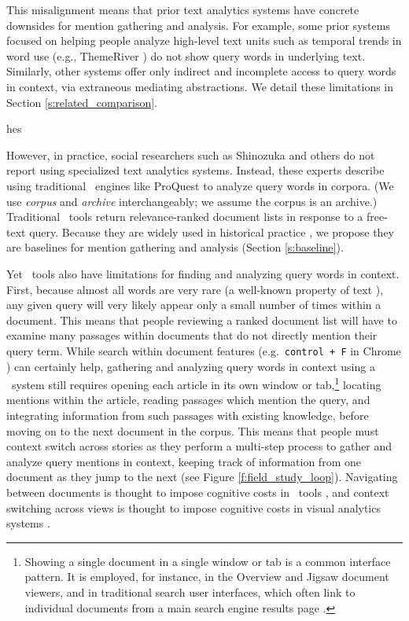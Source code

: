 This misalignment means that prior text analytics systems have concrete downsides for mention gathering and analysis. For example, some prior systems focused on helping people analyze high-level text units such as temporal trends in word use (e.g., ThemeRiver \cite{ThemeRiver}) do not show query words in underlying text. Similarly, other systems offer only indirect and incomplete access to query words in context, via extraneous mediating abstractions. We detail these limitations in Section \ref{s:related_comparison}.

hes



However, in practice, social researchers such as Shinozuka \cite{japanesebeetles} and others \cite{Putnam, FrancesMaule, Loving, watermelon, katrinarefugee, racesuicide} do not report using specialized text analytics systems.
Instead, these experts describe using traditional {\Baselongname~engines} like ProQuest \cite{proquest} to analyze query words in corpora. 
(We use \textit{corpus} and \textit{archive} interchangeably; we assume the corpus is an archive.)
Traditional \Baselongname~tools return relevance-ranked document lists in response to a free-text query.
Because they are widely used in historical practice \cite{allen, Putnam, Chassanoff, FrancesMaule},
we propose they are baselines for mention gathering and analysis (Section \ref{s:baseline}). 

Yet \Baselongname~tools also have limitations for finding and analyzing query words in context.
First, because almost all words are very rare (a well-known property of text \cite{Zipf49}), any given query will very likely appear only a small number of times within a document.
This means that people reviewing a ranked document list will have to examine many passages within documents that do not directly mention their query term.
While search within document features (e.g.\ \texttt{control + F} in Chrome \cite{chromeF}) can certainly help, gathering and analyzing query words in context using a \Baselongname~system still requires opening each article in its own window or tab,\footnote{Showing a single document in a single window or tab is a common interface pattern. It is employed, for instance, in the Overview \cite{overview} and Jigsaw \cite{ubigsaw} document viewers, and in traditional search user interfaces, which often link to individual documents from a main search engine results page \cite[Section 6.3]{croft2010search}.} locating mentions within the article, reading passages which mention the query, and integrating information from such passages with existing knowledge, before moving on to the next document in the corpus.
This means that people must context switch across stories as they perform a multi-step process to gather and analyze query mentions in context, keeping track of information from one document as they jump to the next (see Figure \ref{f:field_study_loop}).
Navigating between documents is thought to impose cognitive costs in \Baselongname~tools \cite{orientationWhite,fluidLinks}, and context switching across views is thought to impose cognitive costs in visual analytics systems \cite{Baldonado}.

